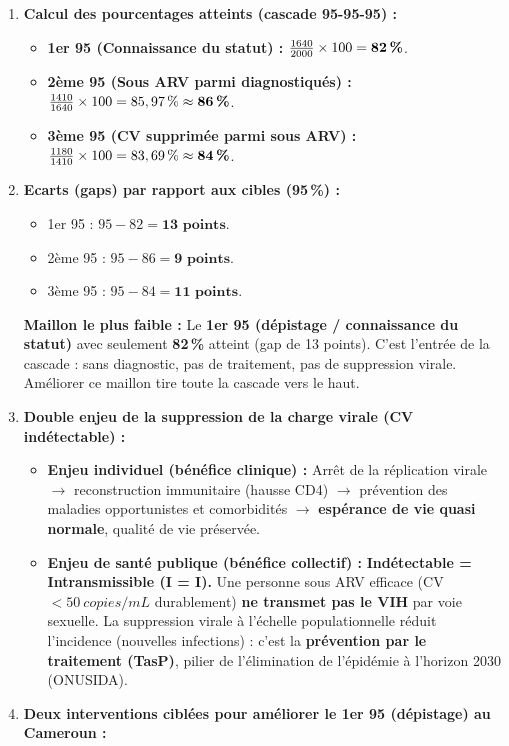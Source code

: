\documentclass[11pt]{article}
\begin{document}
\begin{corrige}
\begin{enumerate}
\item \textbf{Calcul des pourcentages atteints (cascade 95-95-95) :}
\begin{itemize}
\item \textbf{1er 95 (Connaissance du statut) :} $\frac{1640}{2000} \times 100 = \textbf{82\,\%}$.
\item \textbf{2ème 95 (Sous ARV parmi diagnostiqués) :} $\frac{1410}{1640} \times 100 = 85,97\,\% \approx \textbf{86\,\%}$.
\item \textbf{3ème 95 (CV supprimée parmi sous ARV) :} $\frac{1180}{1410} \times 100 = 83,69\,\% \approx \textbf{84\,\%}$.
\end{itemize}
\item \textbf{Ecarts (gaps) par rapport aux cibles (95\,\%) :}
\begin{itemize}
\item 1er 95 : $95 - 82 = \textbf{13 points}$.
\item 2ème 95 : $95 - 86 = \textbf{9 points}$.
\item 3ème 95 : $95 - 84 = \textbf{11 points}$.
\end{itemize}
\textbf{Maillon le plus faible :} Le \textbf{1er 95 (dépistage / connaissance du statut)} avec seulement \textbf{82\,\%} atteint (gap de 13 points). C'est l'entrée de la cascade : sans diagnostic, pas de traitement, pas de suppression virale. Améliorer ce maillon tire toute la cascade vers le haut.
\item \textbf{Double enjeu de la suppression de la charge virale (CV indétectable) :}
\begin{itemize}
\item \textbf{Enjeu individuel (bénéfice clinique) :} Arrêt de la réplication virale $\to$ reconstruction immunitaire (hausse CD4) $\to$ prévention des maladies opportunistes et comorbidités $\to$ \textbf{espérance de vie quasi normale}, qualité de vie préservée.
\item \textbf{Enjeu de santé publique (bénéfice collectif) :} \textbf{Indétectable = Intransmissible (I = I).} Une personne sous ARV efficace (CV $< \SI{50}{copies/mL}$ durablement) \textbf{ne transmet pas le VIH} par voie sexuelle. La suppression virale à l'échelle populationnelle réduit l'incidence (nouvelles infections) : c'est la \textbf{prévention par le traitement (TasP)}, pilier de l'élimination de l'épidémie à l'horizon 2030 (ONUSIDA).
\end{itemize}
\item \textbf{Deux interventions ciblées pour améliorer le 1er 95 (dépistage) au Cameroun :}

\end{enumerate}
\end{corrige}
\end{document}
